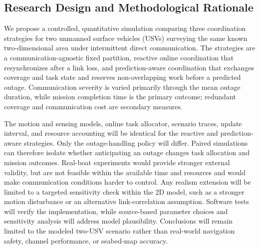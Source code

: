 \subsection{Research Design and Methodological Rationale}

We propose a controlled, quantitative simulation comparing three coordination strategies for two unmanned surface vehicles (USVs) surveying the same known two-dimensional area under intermittent direct communication. The strategies are a communication-agnostic fixed partition, reactive online coordination that resynchronizes after a link loss, and prediction-aware coordination that exchanges coverage and task state and reserves non-overlapping work before a predicted outage. Communication severity is varied primarily through the mean outage duration, while mission completion time is the primary outcome; redundant coverage and communication cost are secondary measures.

The motion and sensing models, online task allocator, scenario traces, update interval, and resource accounting will be identical for the reactive and prediction-aware strategies. Only the outage-handling policy will differ. Paired simulations can therefore isolate whether anticipating an outage changes task allocation and mission outcomes. Real-boat experiments would provide stronger external validity, but are not feasible within the available time and resources and would make communication conditions harder to control. Any realism extension will be limited to a targeted sensitivity check within the 2D model, such as a stronger motion disturbance or an alternative link-correlation assumption. Software tests will verify the implementation, while source-based parameter choices and sensitivity analysis will address model plausibility. Conclusions will remain limited to the modeled two-USV scenario rather than real-world navigation safety, channel performance, or seabed-map accuracy.
